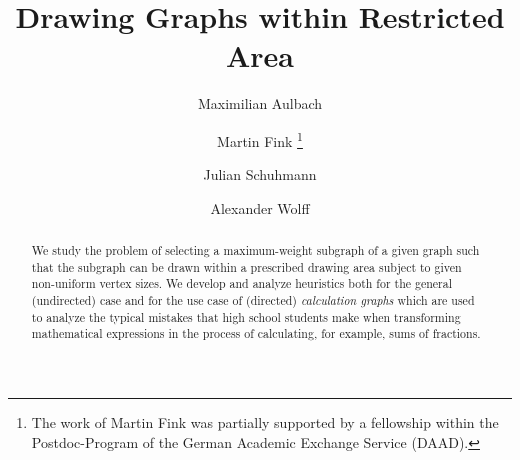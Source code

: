 \documentclass[]{llncs}
\begin{document}
\date{}

\title{Drawing Graphs within Restricted Area}

\author{Maximilian Aulbach  \and Martin Fink 
  \thanks{The work of Martin Fink was partially supported by a
fellowship within the Postdoc-Program of the German Academic Exchange Service
(DAAD).} \and Julian
Schuhmann  \and Alexander Wolff }


\maketitle
\begin{abstract}
  We study the problem of selecting a maximum-weight subgraph of a
  given graph such that the subgraph can be drawn within a prescribed
  drawing area subject to given non-uniform vertex sizes. We develop
  and analyze heuristics both for the general (undirected) case and
  for the use case of (directed) \emph{calculation graphs} which are
  used to analyze the typical mistakes that high school students make
  when transforming mathematical expressions in the process of
  calculating, for example, sums of fractions.
\end{abstract}
\end{document}
